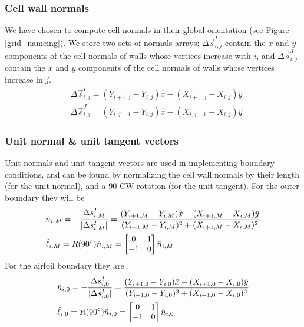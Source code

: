 \documentclass[11pt]{article}
\begin{document}
	\subsubsection*{Cell wall normals}
	We have chosen to compute cell normals in their global orientation (see Figure \ref{grid_nameing}). We store two sets of normals arrays: $\Delta \vec{s}_{i,j}^I$ contain the $x$ and $y$ components of the cell normals of walls whose vertices increase with $i$, and $\Delta \vec{s}_{i,j}^J$ contain the $x$ and $y$ components of the cell normals of walls whose vertices increase in $j$. 
		\begin{align}
		&\Delta \vec{s}_{i,j}^I = (Y_{i+1,j} - Y_{i,j})\hat{x} - (X_{i+1,j} - X_{i,j})\hat{y} \\
		&\Delta \vec{s}_{i,j}^J = (Y_{i,j+1} - Y_{i,j})\hat{x} - (X_{i,j+1} - X_{i,j})\hat{y} 
		\end{align}
	
	\subsubsection*{Unit normal \& unit tangent vectors}
	Unit normals and unit tangent vectors are used in implementing boundary conditions, and can be found by normalizing the cell wall normals by their length (for the unit normal), and a 90 \degree CW rotation (for the unit tangent).  For the outer boundary they will be
		\begin{align}
		&\hat{n}_{i,M} = -\frac{\Delta s_{i,M}^I}{|\Delta s_{i,M}^I|} = \frac{(Y_{i+1,M} - Y_{i,M})\hat{x} - (X_{i+1,M} - X_{i,M})\hat{y}}{(Y_{i+1,M} - Y_{i,M})^2 + (X_{i+1,M} - X_{i,M})^2} \\
		&\hat{\ell}_{i,M} =  R(90 \degree) \hat{n}_{i,M} = \begin{bmatrix} 0 & 1 \\ -1 & 0 \end{bmatrix} \hat{n}_{i,M}
		\end{align}
	For the airfoil boundary they are
		\begin{align}
		&\hat{n}_{i,0} = -\frac{\Delta s_{i,0}^I}{|\Delta s_{i,0}^I|} = \frac{(Y_{i+1,0} - Y_{i,0})\hat{x} - (X_{i+1,0} - X_{i,0})\hat{y}}{(Y_{i+1,0} - Y_{i,0})^2 + (X_{i+1,0} - X_{i,0})^2} \\
		&\hat{\ell}_{i,0} =  R(90 \degree) \hat{n}_{i,0} = \begin{bmatrix} 0 & 1 \\ -1 & 0 \end{bmatrix} \hat{n}_{i,0}
		\end{align}
\end{document}
